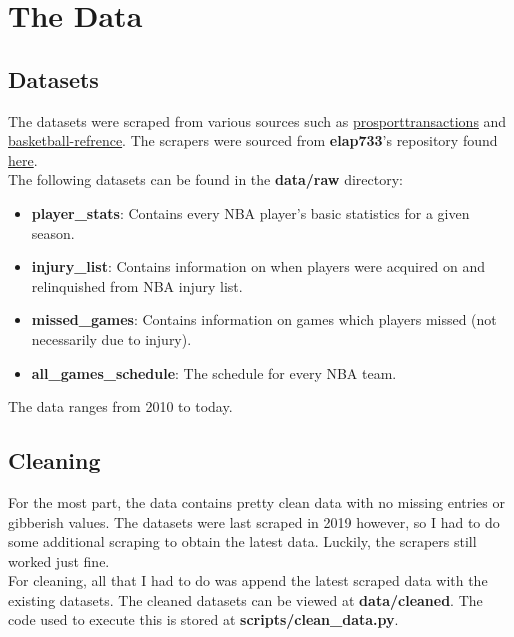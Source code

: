 \documentclass{article}
\begin{document}
\newpage


\section*{The Data}

\subsection*{Datasets}

The datasets were scraped from various sources such as
\href{https://www.prosportstransactions.com/basketball}{prosporttransactions} and
\href{https://www.basketball-reference.com/}{basketball-refrence}. The scrapers
were sourced from \textbf{elap733}'s repository found
\href{https://github.com/elap733/NBA-Injuries-Analysis/tree/master/src/d01_scrapes}{here}.\\

The following datasets can be found in the \textbf{data/raw} directory:
\begin{itemize}
    \item \textbf{player\_stats}: Contains every NBA player's basic statistics for a given season.
    \item \textbf{injury\_list}: Contains information on when players were acquired on and relinquished from NBA injury list.
    \item \textbf{missed\_games}: Contains information on games which players missed (not necessarily due to injury).
    \item \textbf{all\_games\_schedule}: The schedule for every NBA team.
\end{itemize}

The data ranges from 2010 to today.

\subsection*{Cleaning}

For the most part, the data contains pretty clean data with no missing entries
or gibberish values. The datasets were last scraped in 2019 however, so I had to
do some additional scraping to obtain the latest data. Luckily, the scrapers
still worked just fine.\\

For cleaning, all that I had to do was append the latest scraped data
with the existing datasets. The cleaned datasets can be viewed at \textbf{data/cleaned}.
The code used to execute this is stored at \textbf{scripts/clean\_data.py}.
\end{document}

